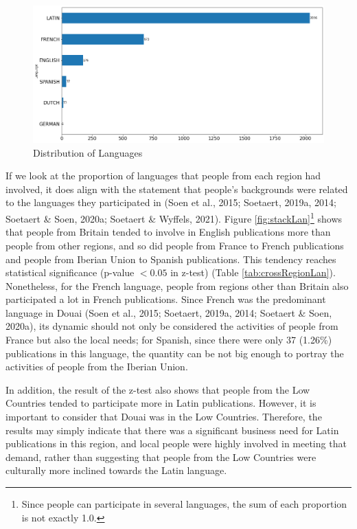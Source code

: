 \documentclass[12pt,a4paper,oneside]{book}
\begin{document}
\begin{sloppypar}
\begin{figure}[H]
\centering
\includegraphics[scale=0.4]{graph/Distribution of Languages.png}
\caption{Distribution of Languages}
\label{fig:distLan}
\end{figure}

If we look at the proportion of languages that people from each region had involved, it does align with the statement that people’s backgrounds were related to the languages they participated in (Soen et al., 2015; Soetaert, 2019a, 2014; Soetaert \& Soen, 2020a; Soetaert \& Wyffels, 2021). Figure \ref{fig:stackLan}\footnote{Since people can participate in several languages, the sum of each proportion is not exactly 1.0.} shows that people from Britain tended to involve in English publications more than people from other regions, and so did people from France to French publications and people from Iberian Union to Spanish publications. This tendency reaches statistical significance (p-value $< 0.05$ in z-test) (Table \ref{tab:crossRegionLan}). Nonetheless, for the French language, people from regions other than Britain also participated a lot in French publications. Since French was the predominant language in Douai (Soen et al., 2015; Soetaert, 2019a, 2014; Soetaert \& Soen, 2020a), its dynamic should not only be considered the activities of people from France but also the local needs; for Spanish, since there were only 37 (1.26\%) publications in this language, the quantity can be not big enough to portray the activities of people from the Iberian Union.

In addition, the result of the z-test also shows that people from the Low Countries tended to participate more in Latin publications. However, it is important to consider that Douai was in the Low Countries. Therefore, the results may simply indicate that there was a significant business need for Latin publications in this region, and local people were highly involved in meeting that demand, rather than suggesting that people from the Low Countries were culturally more inclined towards the Latin language.


\end{sloppypar}
\end{document}
